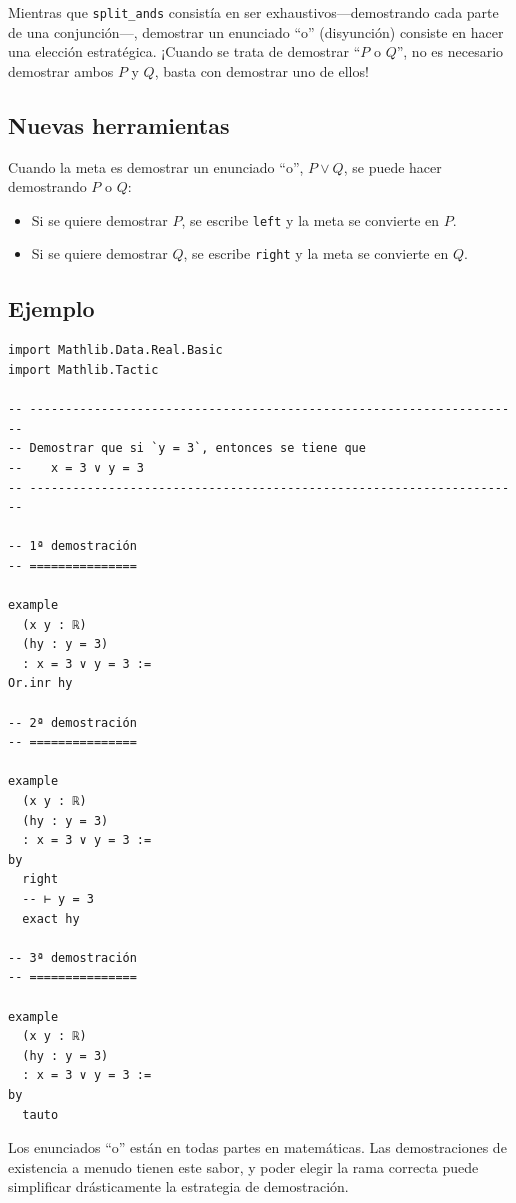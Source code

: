 Mientras que \texttt{split\_ands} consistía en ser exhaustivos---demostrando
cada parte de una conjunción---, demostrar un enunciado ``o'' (disyunción)
consiste en hacer una elección estratégica. ¡Cuando se trata de demostrar
``$P$ o $Q$'', no es necesario demostrar ambos $P$ y $Q$, basta con
demostrar uno de ellos!

\subsection{Nuevas herramientas}

Cuando la meta es demostrar un enunciado ``o'', $P \vee Q$, se puede hacer
demostrando $P$ o $Q$:
\begin{itemize}
  \item Si se quiere demostrar $P$, se escribe \texttt{left} y la meta se
        convierte en $P$.
  \item Si se quiere demostrar $Q$, se escribe \texttt{right} y la meta se
        convierte en $Q$.
\end{itemize}

\subsection{Ejemplo}

\begin{verbatim}
import Mathlib.Data.Real.Basic
import Mathlib.Tactic

-- ---------------------------------------------------------------------
-- Demostrar que si `y = 3`, entonces se tiene que
--    x = 3 ∨ y = 3
-- ---------------------------------------------------------------------

-- 1ª demostración
-- ===============

example
  (x y : ℝ)
  (hy : y = 3)
  : x = 3 ∨ y = 3 :=
Or.inr hy

-- 2ª demostración
-- ===============

example
  (x y : ℝ)
  (hy : y = 3)
  : x = 3 ∨ y = 3 :=
by
  right
  -- ⊢ y = 3
  exact hy

-- 3ª demostración
-- ===============

example
  (x y : ℝ)
  (hy : y = 3)
  : x = 3 ∨ y = 3 :=
by
  tauto
\end{verbatim}

Los enunciados ``o'' están en todas partes en matemáticas. Las
demostraciones de existencia a menudo tienen este sabor, y poder elegir la
rama correcta puede simplificar drásticamente la estrategia de demostración.

